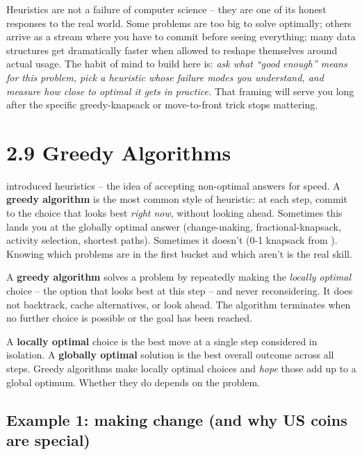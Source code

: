 \documentclass[11pt]{article}
\begin{document}
\begin{ideabox}
Heuristics are not a failure of computer science -- they are one of
its honest responses to the real world. Some problems are too big to
solve optimally; others arrive as a stream where you have to commit
before seeing everything; many data structures get dramatically
faster when allowed to reshape themselves around actual usage. The
habit of mind to build here is: \emph{ask what ``good enough'' means
for this problem, pick a heuristic whose failure modes you
understand, and measure how close to optimal it gets in practice.}
That framing will serve you long after the specific greedy-knapsack
or move-to-front trick stops mattering.
\end{ideabox}

\section{2.9 Greedy Algorithms}

 introduced heuristics -- the idea of accepting
non-optimal answers for speed. A \textbf{greedy algorithm} is the most
common style of heuristic: at each step, commit to the choice that
looks best \emph{right now}, without looking ahead. Sometimes this
lands you at the globally optimal answer (change-making,
fractional-knapsack, activity selection, shortest paths). Sometimes
it doesn't (0-1 knapsack from ). Knowing which
problems are in the first bucket and which aren't is the real skill.

\begin{defnbox}
A \textbf{greedy algorithm} solves a problem by repeatedly making the
\emph{locally optimal} choice -- the option that looks best at this
step -- and never reconsidering. It does not backtrack, cache
alternatives, or look ahead. The algorithm terminates when no further
choice is possible or the goal has been reached.
\end{defnbox}

\begin{defnbox}
A \textbf{locally optimal} choice is the best move at a single step
considered in isolation. A \textbf{globally optimal} solution is the
best overall outcome across all steps. Greedy algorithms make locally
optimal choices and \emph{hope} those add up to a global optimum.
Whether they do depends on the problem.
\end{defnbox}

\subsection{Example 1: making change (and why US coins are special)}
\end{document}
